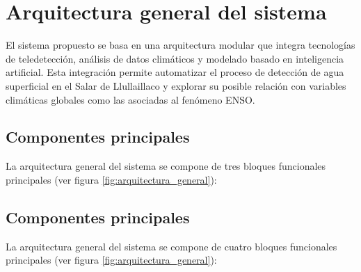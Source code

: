 \newpage
\section{Arquitectura general del sistema}

El sistema propuesto se basa en una arquitectura modular que integra tecnologías de teledetección, análisis de datos climáticos y modelado basado en inteligencia artificial. Esta integración permite automatizar el proceso de detección de agua superficial en el Salar de Llullaillaco y explorar su posible relación con variables climáticas globales como las asociadas al fenómeno ENSO.

\subsection*{Componentes principales}

La arquitectura general del sistema se compone de tres bloques funcionales principales (ver figura \ref{fig:arquitectura_general}):

\subsection*{Componentes principales}

La arquitectura general del sistema se compone de cuatro bloques funcionales principales (ver figura \ref{fig:arquitectura_general}):

